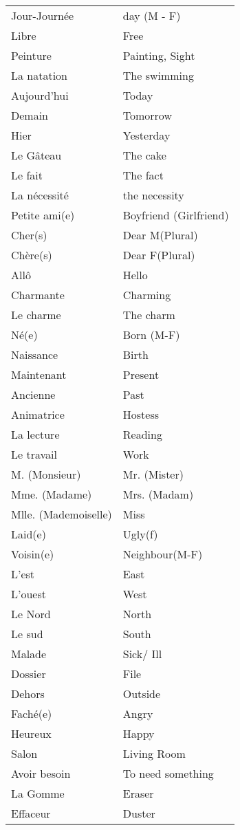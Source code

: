 \begin{longtable}{l  l}
Jour-Journ\'ee & day (M - F) \\
Libre & Free \\
Peinture & Painting, Sight \\
La natation & The swimming \\
Aujourd'hui & Today \\
Demain & Tomorrow \\
Hier & Yesterday \\
Le G\^ateau & The cake \\
Le fait & The fact \\
La n\'ecessit\'e & the necessity \\
Petite ami(e) & Boyfriend (Girlfriend) \\
Cher(s) & Dear M(Plural) \\
Ch\`ere(s) & Dear F(Plural) \\
All\^o & Hello \\
Charmante & Charming \\
Le charme & The charm \\
N\'e(e) & Born (M-F) \\
Naissance & Birth \\
Maintenant & Present \\
Ancienne & Past \\
Animatrice & Hostess \\
La lecture & Reading \\
Le travail & Work \\
M. (Monsieur) & Mr. (Mister) \\
Mme. (Madame) & Mrs. (Madam) \\
Mlle. (Mademoiselle) & Miss \\
Laid(e) & Ugly(f) \\
Voisin(e) & Neighbour(M-F)\\
L'est & East \\
L'ouest & West \\
Le Nord & North \\
Le sud & South \\
Malade & Sick/ Ill \\
Dossier & File \\
Dehors & Outside \\
Fach\'e(e) & Angry \\
Heureux & Happy\\
Salon & Living Room \\
Avoir besoin & To need something\\
La Gomme & Eraser \\
Effaceur & Duster\\

\end{longtable}

